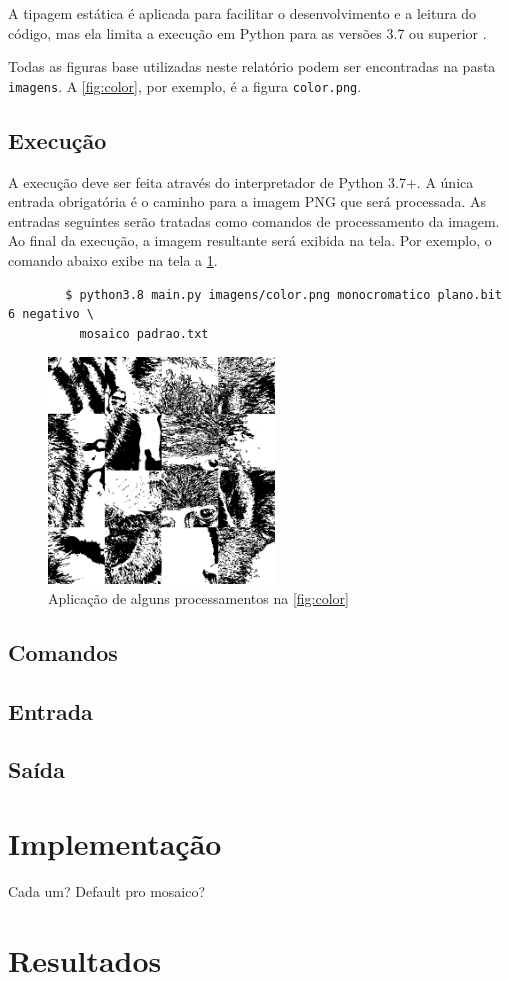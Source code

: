 \documentclass[assignment = 0]{homework}
\begin{document}
    A tipagem estática é aplicada para facilitar o desenvolvimento e a leitura do código, mas ela limita a execução em Python para as versões 3.7 ou superior \autocite{ref:pep563}.

    Todas as figuras base utilizadas neste relatório podem ser encontradas na pasta \texttt{imagens}. A \cref{fig:color}, por exemplo, é a figura \texttt{color.png}.

    \subsection{Execução}

    A execução deve ser feita através do interpretador de Python 3.7+. A única entrada obrigatória é o caminho para a imagem PNG que será processada. As entradas seguintes serão tratadas como comandos de processamento da imagem. Ao final da execução, a imagem resultante será exibida na tela. Por exemplo, o comando abaixo exibe na tela a \cref{fig:execucao}.

    \begin{verbatim}
        $ python3.8 main.py imagens/color.png monocromatico plano.bit 6 negativo \
          mosaico padrao.txt
    \end{verbatim}

    \begin{figure}[H]
        \centering
        \includegraphics[width=6cm]{resultados/execucao.png}

        \caption{Aplicação de alguns processamentos na \cref{fig:color}}
        \label{fig:execucao}
    \end{figure}

    \subsection{Comandos}
    \subsection{Entrada}
    \subsection{Saída}

    \section{Implementação}
    Cada um? Default pro mosaico?

    \section{Resultados}
\end{document}
